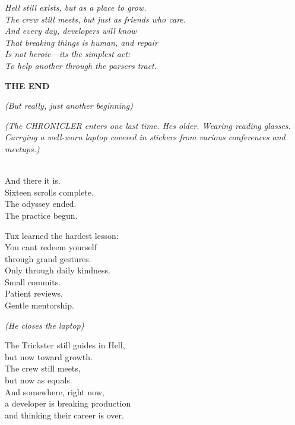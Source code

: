 \emph{Hell still exists, but as a place to grow.}\\
\emph{The crew still meets, but just as friends who care.}\\
\emph{And every day, developers will know}\\
\emph{That breaking things is human, and repair}\\
\emph{Is not heroic---it\textquotesingle s the simplest act:}\\
\emph{To help another through the parser\textquotesingle s tract.}


\textbf{THE END}

\emph{(But really, just another beginning)}

\bookdivider

\label{performing_arts-final-closing}

\emph{(The CHRONICLER enters one last time. He\textquotesingle s older. Wearing reading glasses. Carrying a well-worn laptop covered in stickers from various conferences and meetups.)}

\\
And there it is.\\
Sixteen scrolls complete.\\
The odyssey ended.\\
The practice begun.

Tux learned the hardest lesson:\\
You can\textquotesingle t redeem yourself\\
through grand gestures.\\
Only through daily kindness.\\
Small commits.\\
Patient reviews.\\
Gentle mentorship.

\emph{(He closes the laptop)}

The Trickster still guides in Hell,\\
but now toward growth.\\
The crew still meets,\\
but now as equals.\\
And somewhere, right now,\\
a developer is breaking production\\
and thinking their career is over.

